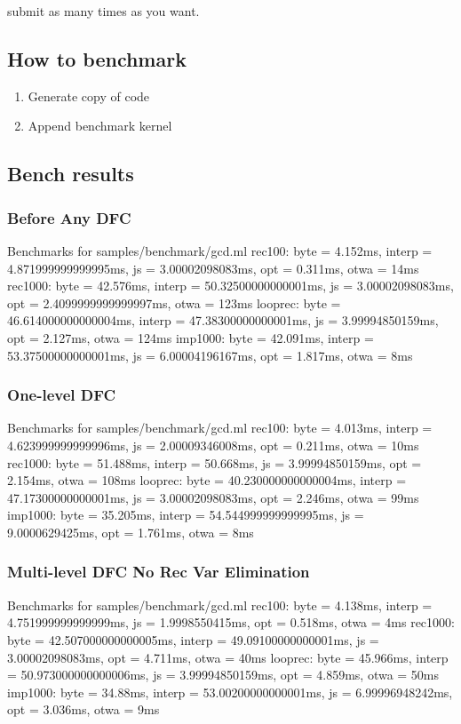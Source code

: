 \documentclass{report}
\begin{document}
submit as many times as you want.

\subsection*{How to benchmark}
\begin{enumerate}
	\item Generate copy of code
	\item Append benchmark kernel
	
\end{enumerate}

\subsection*{Bench results}
\subsubsection*{Before Any DFC}
Benchmarks for samples/benchmark/gcd.ml
rec100: byte = 4.152ms, interp = 4.871999999999995ms, js = 3.00002098083ms, opt = 0.311ms, otwa = 14ms
rec1000: byte = 42.576ms, interp = 50.32500000000001ms, js = 3.00002098083ms, opt = 2.4099999999999997ms, otwa = 123ms
looprec: byte = 46.614000000000004ms, interp = 47.38300000000001ms, js = 3.99994850159ms, opt = 2.127ms, otwa = 124ms
imp1000: byte = 42.091ms, interp = 53.37500000000001ms, js = 6.00004196167ms, opt = 1.817ms, otwa = 8ms

\subsubsection*{One-level DFC}
Benchmarks for samples/benchmark/gcd.ml
rec100: byte = 4.013ms, interp = 4.623999999999996ms, js = 2.00009346008ms, opt = 0.211ms, otwa = 10ms
rec1000: byte = 51.488ms, interp = 50.668ms, js = 3.99994850159ms, opt = 2.154ms, otwa = 108ms
looprec: byte = 40.230000000000004ms, interp = 47.17300000000001ms, js = 3.00002098083ms, opt = 2.246ms, otwa = 99ms
imp1000: byte = 35.205ms, interp = 54.544999999999995ms, js = 9.0000629425ms, opt = 1.761ms, otwa = 8ms

\subsubsection*{Multi-level DFC No Rec Var Elimination}
Benchmarks for samples/benchmark/gcd.ml
rec100: byte = 4.138ms, interp = 4.751999999999999ms, js = 1.9998550415ms, opt = 0.518ms, otwa = 4ms
rec1000: byte = 42.507000000000005ms, interp = 49.09100000000001ms, js = 3.00002098083ms, opt = 4.711ms, otwa = 40ms
looprec: byte = 45.966ms, interp = 50.973000000000006ms, js = 3.99994850159ms, opt = 4.859ms, otwa = 50ms
imp1000: byte = 34.88ms, interp = 53.00200000000001ms, js = 6.99996948242ms, opt = 3.036ms, otwa = 9ms
\end{document}

